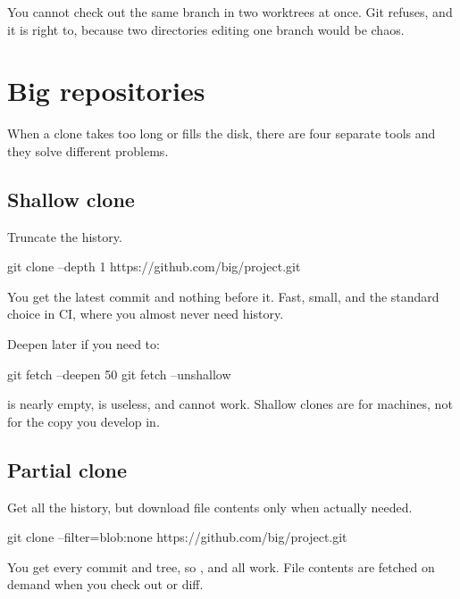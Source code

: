 \documentclass[11pt]{article}
\begin{document}
\begin{trap}
You cannot check out the same branch in two worktrees at once. Git refuses, and it
is right to, because two directories editing one branch would be chaos.
\end{trap}

\section{Big repositories}

When a clone takes too long or fills the disk, there are four separate tools and
they solve different problems.

\subsection{Shallow clone}

Truncate the history.

\begin{shell}
git clone --depth 1 https://github.com/big/project.git
\end{shell}

You get the latest commit and nothing before it. Fast, small, and the standard
choice in CI, where you almost never need history.

Deepen later if you need to:

\begin{shell}
git fetch --deepen 50
git fetch --unshallow
\end{shell}

\begin{trap}
 is nearly empty,  is useless, and  cannot
work. Shallow clones are for machines, not for the copy you develop in.
\end{trap}

\subsection{Partial clone}

Get all the history, but download file contents only when actually needed.

\begin{shell}
git clone --filter=blob:none https://github.com/big/project.git
\end{shell}

You get every commit and tree, so ,  and  all work.
File contents are fetched on demand when you check out or diff.
\end{document}
